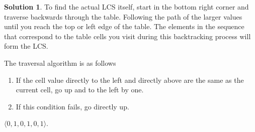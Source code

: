 \documentclass{article}
\theoremstyle{definition}
\newtheorem*{solution}{Solution}
\begin{document}
\begin{solution}
\noindent
To find the actual LCS itself, start in the bottom right corner and traverse backwards through the table.
Following the path of the larger values until you reach the top or left edge of the table.
The elements in the sequence that correspond to the table cells you visit during this backtracking process will form the LCS.

\noindent
The traversal algorithm is as follows
\begin{enumerate}
    \item If the cell value directly to the left and directly above are the same as the current cell, go up and to the left by one.
    \item If this condition fails, go directly up.
\end{enumerate}
$\langle0,1,0,1,0,1\rangle$.
\end{solution}
\end{document}
